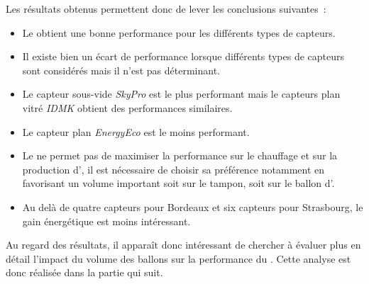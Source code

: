 Les résultats obtenus permettent donc de lever les conclusions suivantes~:
\begin{itemize}
    \item Le  obtient une bonne performance pour les différents types de
          capteurs.
    \item Il existe bien un écart de performance lorsque différents types de capteurs
          sont considérés mais il n’est pas déterminant.
    \item Le capteur sous-vide \textit{SkyPro} est le plus performant mais le capteurs
          plan vitré \textit{IDMK} obtient des performances similaires.
    \item Le capteur plan \textit{EnergyEco} est le moins performant.
    \item Le  ne permet pas de maximiser la performance sur le chauffage
          et sur la production d’, il est nécessaire de choisir sa préférence
          notamment en favorisant un volume important soit sur le tampon, soit sur le
          ballon d’.
    \item Au delà de quatre capteurs pour Bordeaux et six capteurs pour Strasbourg,
          le gain énergétique est moins intéressant.
\end{itemize}

Au regard des résultats, il apparaît donc intéressant de chercher à évaluer plus en détail
l’impact du volume des ballons sur la performance du . Cette analyse est donc
réalisée dans la partie qui suit.


